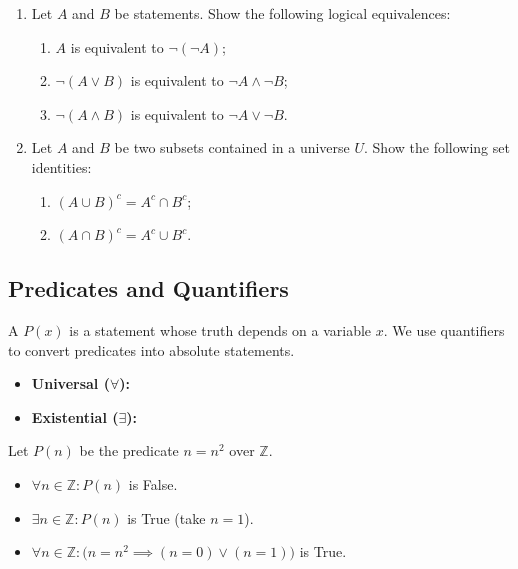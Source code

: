 \begin{exercise}
\label{exer:de_morgan}
\begin{enumerate}[label=\textbf{(\alph*)}]
    \item Let $A$ and $B$ be statements. Show the following logical equivalences:
    \begin{enumerate}[label=\textbf{(\roman*)}]
        \item $A$ is equivalent to $\neg(\neg A)$;
        \item $\neg(A \vee B)$ is equivalent to $\neg A \wedge \neg B$;
        \item $\neg(A \wedge B)$ is equivalent to $\neg A \vee \neg B$.
    \end{enumerate}
    \item Let $A$ and $B$ be two subsets contained in a universe $U$. Show the following set identities:
    \begin{enumerate}[label=\textbf{(\roman*)}]
        \item $(A \cup B)^c = A^c \cap B^c$;
        \item $(A \cap B)^c = A^c \cup B^c$.
    \end{enumerate}
\end{enumerate}
\end{exercise}

\subsection{Predicates and Quantifiers}

A  $P(x)$ is a statement whose truth depends on a variable $x$. We use quantifiers to convert predicates into absolute statements.

\begin{definition}[Quantifiers]
\label{def:quantifiers}
\begin{itemize}
    \item \textbf{Universal ($\forall$):} 
    \item \textbf{Existential ($\exists$):} 
\end{itemize}
\end{definition}

\begin{example}
\label{ex:quantifiers_integers}
Let $P(n)$ be the predicate $n = n^2$ over $\mathbb{Z}$.
\begin{itemize}
    \item $\forall n \in \mathbb{Z} : P(n)$ is False.
    \item $\exists n \in \mathbb{Z} : P(n)$ is True (take $n=1$).
    \item $\forall n \in \mathbb{Z} : \bigl( n = n^2 \implies (n = 0) \vee (n = 1) \bigr)$ is True.
\end{itemize}
\end{example}

